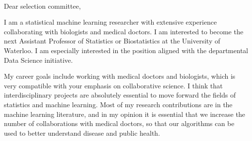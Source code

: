\documentclass{article}
\begin{document}
\mbox{ }

Dear selection committee,

I am a 
statistical machine learning researcher with extensive experience
collaborating with biologists and medical doctors. I am interested to
become the next Assistant Professor of Statistics or Biostatistics at
the University of Waterloo. I am especially interested in the position
aligned with the departmental Data Science initiative.


My career goals include working with medical doctors and
biologists, which is very compatible with your emphasis on
collaborative science. I think that interdisciplinary projects are
absolutely essential to move forward the fields of 
statistics 
and machine learning. Most of my research
contributions are in the machine learning literature, and in my
opinion it is essential that we increase the number of collaborations
with medical doctors, so that our algorithms can be used to better
understand disease and public health.

\end{document}
